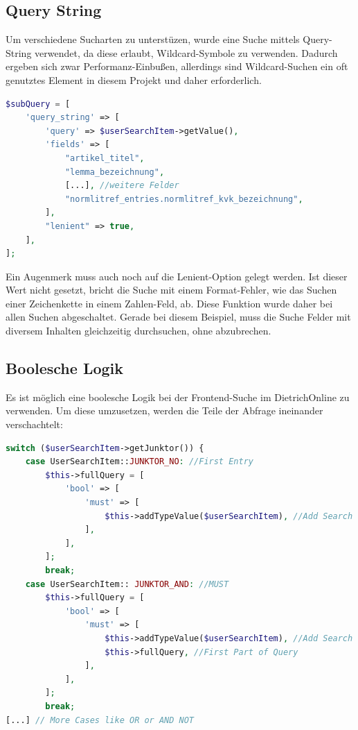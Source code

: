 \subsection{Query String}
Um verschiedene Sucharten zu unterstüzen, wurde eine Suche mittels Query-String verwendet, da diese erlaubt, Wildcard-Symbole zu verwenden. Dadurch ergeben sich zwar Performanz-Einbußen, allerdings sind Wildcard-Suchen ein oft genutztes Element in diesem Projekt und daher erforderlich.

\begin{lstlisting}[language=PHP, frame=single, label={lst:aufbauQueryString}, caption=Beispiel eines Query-Strings,captionpos=b] 
$subQuery = [
    'query_string' => [
        'query' => $userSearchItem->getValue(),
        'fields' => [
            "artikel_titel",
            "lemma_bezeichnung",
            [...], //weitere Felder
            "normlitref_entries.normlitref_kvk_bezeichnung",
        ],
        "lenient" => true,
    ],
];
\end{lstlisting}

Ein Augenmerk muss auch noch auf die Lenient-Option gelegt werden. Ist dieser Wert nicht gesetzt, bricht die Suche mit einem Format-Fehler, wie das Suchen einer Zeichenkette in einem Zahlen-Feld, ab. Diese Funktion wurde daher bei allen Suchen abgeschaltet. Gerade bei diesem Beispiel, muss die Suche Felder mit diversem Inhalten gleichzeitig durchsuchen, ohne abzubrechen. \cite{ElasticsearchB.V..13.2.2020}

\subsection{Boolesche Logik}

Es ist möglich eine boolesche Logik bei der Frontend-Suche im DietrichOnline zu verwenden. Um diese umzusetzen, werden die Teile der Abfrage ineinander verschachtelt:

\begin{lstlisting}[language=PHP, frame=single, label={lst:booleanEla}, caption=Auschnitt aus der boolischen Logik für das DietrichOnline-Projekt,captionpos=b] 
switch ($userSearchItem->getJunktor()) {
    case UserSearchItem::JUNKTOR_NO: //First Entry
        $this->fullQuery = [
            'bool' => [
                'must' => [
                    $this->addTypeValue($userSearchItem), //Add Search
                ],
            ],
        ];
        break;
    case UserSearchItem:: JUNKTOR_AND: //MUST
        $this->fullQuery = [
            'bool' => [
                'must' => [
                    $this->addTypeValue($userSearchItem), //Add Search
                    $this->fullQuery, //First Part of Query
                ],
            ],
        ];
        break;
[...] // More Cases like OR or AND NOT
\end{lstlisting}

